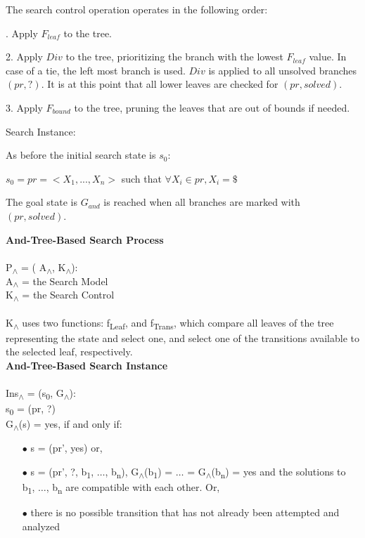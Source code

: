 \documentclass[11pt, oneside]{article}   	%
\begin{document}
The search control operation operates in the following order:

. Apply $F_{leaf}$ to the tree.

2. Apply $Div$ to the tree, prioritizing the branch with the lowest $F_{leaf}$ value. In case of a tie, the left most branch is used. $Div$ is applied to all unsolved branches $(pr, ?)$. It is at this point that all lower leaves are checked for $(pr, solved)$.

3. Apply $F_{bound}$ to the tree, pruning the leaves that are out of bounds if needed.

\bigskip
\bigskip
\bigskip
\bigskip
 
Search Instance:

As before the initial search state is $s_0$:

\bigskip

$s_0 = pr = <X_1, ..., X_n> $ such that $\forall X_i \in pr, X_i = \$ $ 

\bigskip

The goal state is $G_{and}$ is reached when all branches are marked with $(pr, solved)$.

\noindent \textbf{And-Tree-Based Search Process}\\\\
P\textsubscript{$\land$} = ( A\textsubscript{$\land$}, K\textsubscript{$\land$}):\\
\indent A\textsubscript{$\land$} = the Search Model\\
\indent K\textsubscript{$\land$} = the Search Control\\\\
\noindent K\textsubscript{$\land$} uses two functions: f\textsubscript{Leaf}, and f\textsubscript{Trans}, which compare all leaves of the tree representing the state and select one, and select one of the transitions available to the selected leaf, respectively.\\

\noindent \textbf{And-Tree-Based Search Instance}\\\\
Ins\textsubscript{$\land$} = (s\textsubscript{0}, G\textsubscript{$\land$}):\\
\indent s\textsubscript{0} = (pr, ?)\\
\indent G\textsubscript{$\land$}(s) = yes, if and only if:
\begin{enumerate}[leftmargin=25mm,topsep=0pt]
\item[$\bullet$] s = (pr', yes) or,
\item[$\bullet$] s = (pr', ?, b\textsubscript{1}, $\ldots$, b\textsubscript{n}), G\textsubscript{$\land$}(b\textsubscript{1}) = $\ldots$ = G\textsubscript{$\land$}(b\textsubscript{n}) = yes and the solutions to b\textsubscript{1}, $\ldots$, b\textsubscript{n} are compatible with each other. Or,
\item[$\bullet$] there is no possible transition that has not already been attempted and analyzed
\end{enumerate}
\end{document}
